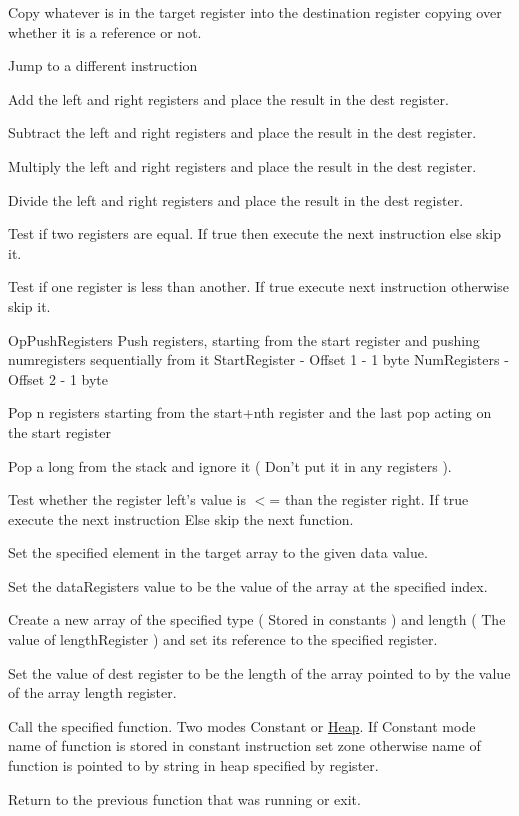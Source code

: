 Copy whatever is in the target register into the destination register copying over whether it is a reference or not.

Jump to a different instruction

Add the left and right registers and place the result in the dest register.

Subtract the left and right registers and place the result in the dest register.

Multiply the left and right registers and place the result in the dest register.

Divide the left and right registers and place the result in the dest register.

Test if two registers are equal. If true then execute the next instruction else skip it.

Test if one register is less than another. If true execute next instruction otherwise skip it.

Op\-Push\-Registers Push registers, starting from the start register and pushing numregisters sequentially from it Start\-Register -\/ Offset 1 -\/ 1 byte Num\-Registers -\/ Offset 2 -\/ 1 byte

Pop n registers starting from the start+nth register and the last pop acting on the start register

Pop a long from the stack and ignore it ( Don't put it in any registers ).

Test whether the register left's value is $<$= than the register right. If true execute the next instruction Else skip the next function.

Set the specified element in the target array to the given data value.

Set the data\-Registers value to be the value of the array at the specified index.

Create a new array of the specified type ( Stored in constants ) and length ( The value of length\-Register ) and set its reference to the specified register.

Set the value of dest register to be the length of the array pointed to by the value of the array length register.

Call the specified function. Two modes Constant or \hyperlink{class_v_m_1_1_heap}{Heap}. If Constant mode name of function is stored in constant instruction set zone otherwise name of function is pointed to by string in heap specified by register.

Return to the previous function that was running or exit.

